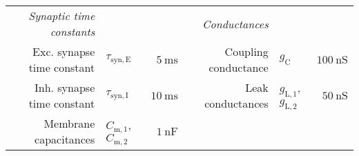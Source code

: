 \begin{table}[h!]
\begin{tabular}{r l r r l r}
		
		\textit{Synaptic time constants} &&& \textit{Conductances}\\
		
		Exc. synapse time constant &
		$\tau_\mathrm{syn,E}$ &
		$\SI{5}{\milli\second}$ &
		
		Coupling conductance &
		$g_\mathrm{C}$ &
		$\SI{100}{\nano\siemens}$ \\
		
		Inh. synapse time constant &
		$\tau_\mathrm{syn,I}$ &
		$\SI{10}{\milli\second}$ &
		
		Leak conductances &
		$g_\mathrm{L,1}$, $g_\mathrm{L,2}$ &
		$\SI{50}{\nano\siemens}$ \\
		
		Membrane capacitances &
		$C_\mathrm{m,1}$, $C_\mathrm{m,2}$ &
		$\SI{1}{\nano\farad}$\\
		\bottomrule
	\end{tabular}
\end{table}

